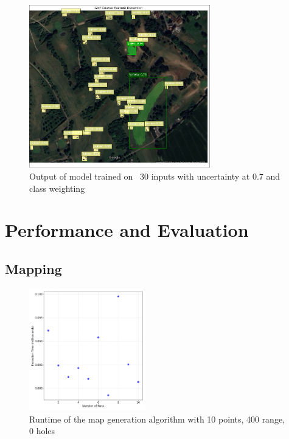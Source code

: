 \documentclass[final]{cmpreport_02}
\begin{document}
\begin{figure}[h!]
	\centering
	\includegraphics[width=0.7\textwidth]{./images/AEEnglishCourseResult.png}
	\caption{Output of model trained on ~30 inputs with uncertainty at 0.7 and class weighting}
	\label{am:AEEnglishCourseResult}
\end{figure}



\clearpage
\section{Performance and Evaluation}
\subsection{Mapping}


\begin{figure}[h!]
	\centering
	\includegraphics[width=0.45\textwidth]{./images/mapGenBaselineRT.png}
	\caption{Runtime of the map generation algorithm with 10 points, 400 range, 0 holes}
	\label{PE:mg:baselineRT}
\end{figure}
\end{document}
